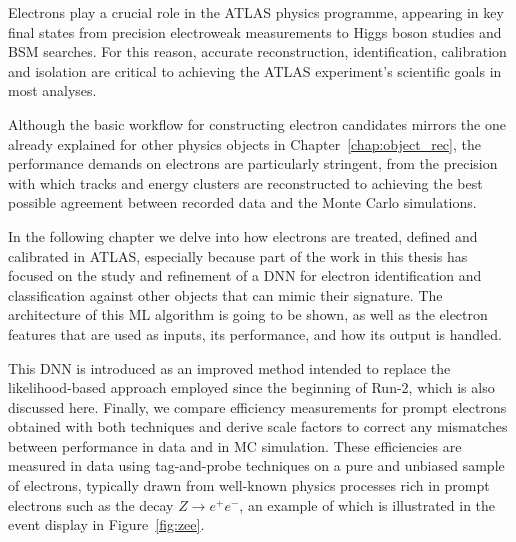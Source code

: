 \usepackage{tabularx}

\newcommand*{\zee}{$Z \to e^{+}e^{-}$\xspace}
\newcommand*{\et}{$E_{\text{T}}$\xspace}
\newcommand*{\zmass}{$\text{Z}_{\text{mass}}$\xspace}
\newcommand*{\ziso}{$\text{Z}_{\text{iso}}$\xspace}
\newcommand*{\tp}{T$\&$P\xspace}
\newcommand*{\et}{$E_{\text{T}}$\xspace}
\newcommand*{\eta}{$\eta$\xspace}

\setcounter{secnumdepth}{3}

Electrons play a crucial role in the ATLAS physics programme, appearing in key final states from precision electroweak measurements to Higgs boson studies and BSM searches. For this reason, accurate reconstruction, identification, calibration and isolation are critical to achieving the ATLAS experiment’s scientific goals in most analyses.  

Although the basic workflow for constructing electron candidates mirrors the one already explained for other physics objects in Chapter~\ref{chap:object_rec}, the performance demands on electrons are particularly stringent, from the precision with which tracks and energy clusters are reconstructed to achieving the best possible agreement between recorded data and the Monte Carlo simulations.  

In the following chapter we delve into how electrons are treated, defined and calibrated in ATLAS, especially because part of the work in this thesis has focused on the study and refinement of a DNN for electron identification and classification against other objects that can mimic their signature.  The architecture of this ML algorithm is going to be shown, as well as the electron features that are used as inputs, its performance, and how its output is handled. 

This DNN is introduced as an improved method intended to replace the likelihood-based approach employed since the beginning of Run-2, which is also discussed here.  Finally, we compare efficiency measurements for prompt electrons obtained with both techniques and derive scale factors to correct any mismatches between performance in data and in MC simulation.  These efficiencies are measured in data using tag-and-probe techniques on a pure and unbiased sample of electrons, typically drawn from well-known physics processes rich in prompt electrons such as the decay $Z\to e^+e^-$, an example of which is illustrated in the event display in Figure~\ref{fig:zee}.

